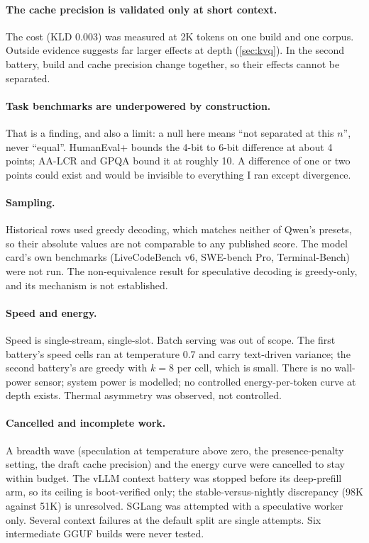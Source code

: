 \paragraph{The cache precision is validated only at short context.} The  cost (KLD 0.003)
was measured at 2K tokens on one build and one corpus. Outside evidence suggests far larger effects at
depth (\cref{sec:kvq}). In the second battery, build and cache precision change together, so their
effects cannot be separated.

\paragraph{Task benchmarks are underpowered by construction.} That is a finding, and also a limit: a
null here means ``not separated at this $n$'', never ``equal''. HumanEval+ bounds the 4-bit to 6-bit
difference at about 4 points; AA-LCR and GPQA bound it at roughly 10. A difference of one or two points
could exist and would be invisible to everything I ran except divergence.

\paragraph{Sampling.} Historical rows used greedy decoding, which matches neither of Qwen's presets, so
their absolute values are not comparable to any published score. The model card's own benchmarks
(LiveCodeBench v6, SWE-bench Pro, Terminal-Bench) were not run. The non-equivalence result for
speculative decoding is greedy-only, and its mechanism is not established.

\paragraph{Speed and energy.} Speed is single-stream, single-slot. Batch serving was out of scope. The
first battery's speed cells ran at temperature 0.7 and carry text-driven variance; the second
battery's are greedy with $k=8$ per cell, which is small. There is no wall-power sensor; system power
is modelled; no controlled energy-per-token curve at depth exists. Thermal asymmetry was observed, not
controlled.

\paragraph{Cancelled and incomplete work.} A breadth wave (speculation at temperature above zero, the
presence-penalty setting, the draft cache precision) and the energy curve were cancelled to stay
within budget. The vLLM context battery was stopped before its deep-prefill arm, so its ceiling is
boot-verified only; the stable-versus-nightly discrepancy (98K against 51K) is unresolved. SGLang was
attempted with a speculative worker only. Several context failures at the default split are single
attempts. Six intermediate GGUF builds were never tested.

